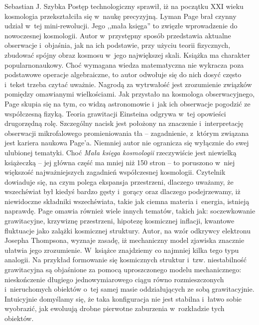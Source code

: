 \begin{newrevplenv}{Sebastian J. Szybka}
Postęp technologiczny sprawił, iż na początku XXI wieku kosmologia przekształciła się w~naukę precyzyjną. Lyman Page brał czynny udział w~tej mini-rewolucji. Jego ,,mała księga'' to zwięzłe wprowadzenie do nowoczesnej kosmologii. Autor w~przystępny sposób przedstawia aktualne obserwacje i~objaśnia, jak na ich podstawie, przy użyciu teorii fizycznych, zbudować spójny obraz kosmosu w~jego największej skali. Książka ma charakter popularnonaukowy. Choć wymagana wiedza matematyczna nie wykracza poza podstawowe operacje algebraiczne, to autor odwołuje się do nich dosyć często i~tekst trzeba czytać uważnie. Nagrodą za wytrwałość jest zrozumienie związków pomiędzy omawianymi wielkościami. Jak przystało na kosmologa obserwacyjnego, Page skupia się na tym, co widzą astronomowie i~jak ich obserwacje pogodzić ze współczesną fizyką. Teoria grawitacji Einsteina odgrywa w~tej opowieści drugorzędną rolę. Szczególny nacisk jest położony na znaczenie i~interpretację obserwacji mikrofalowego promieniowania tła -- zagadnienie, z~którym związana jest kariera naukowa Page'a. Niemniej autor nie ogranicza się wyłącznie do swej ulubionej tematyki. Choć \textit{Mała księga kosmologii} rzeczywiście jest niewielką książeczką -- jej główna część ma mniej niż 150 stron -- to poruszono w~niej większość najważniejszych zagadnień współczesnej kosmologii. Czytelnik dowiaduje się, na czym polega ekspansja przestrzeni, dlaczego uważamy, że wszechświat był kiedyś bardzo gęsty i~gorący oraz dlaczego podejrzewamy, iż niewidoczne składniki wszechświata, takie jak ciemna materia i~energia, istnieją naprawdę. Page omawia również wiele innych tematów, takich jak: soczewkowanie grawitacyjne, krzywiznę przestrzeni, hipotezę kosmicznej inflacji, kwantowe fluktuacje jako zalążki kosmicznej struktury. Autor, na wzór odkrywcy elektronu Josepha Thompsona, wyznaje zasadę, iż mechaniczny model zjawiska znacznie ułatwia jego zrozumienie. W~książce znajdziemy co najmniej kilka tego typu analogii. Na przykład formowanie się kosmicznych struktur i~tzw. niestabilność grawitacyjna są objaśnione za pomocą uproszczonego modelu mechanicznego: nieskończenie długiego jednowymiarowego ciągu równo rozmieszczonych i~nieruchomych obiektów o~tej samej masie oddziałujących ze sobą grawitacyjnie. Intuicyjnie domyślamy się, że taka konfiguracja nie jest stabilna i~łatwo sobie wyobrazić, jak ewoluują drobne pierwotne zaburzenia w~rozkładzie tych obiektów.


\end{newrevplenv}
